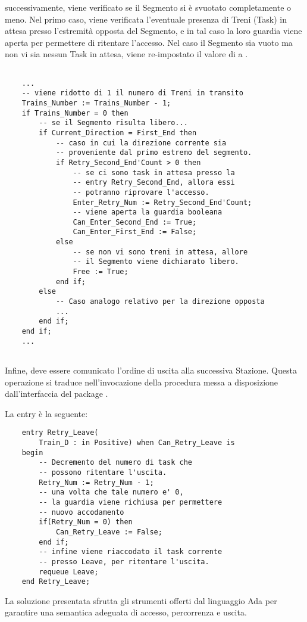 	successivamente, viene verificato se il Segmento si è svuotato completamente o meno. Nel primo caso, viene verificata l'eventuale presenza di Treni (Task) in attesa presso l'estremità opposta del Segmento, e in tal caso la loro guardia viene aperta per permettere
di ritentare l'accesso. Nel caso il Segmento sia vuoto ma non vi sia nessun Task in attesa, viene re-impostato il valore di  a .

\begin{lstlisting}
	
	...
	-- viene ridotto di 1 il numero di Treni in transito
	Trains_Number := Trains_Number - 1;
	if Trains_Number = 0 then
		-- se il Segmento risulta libero...
		if Current_Direction = First_End then
			-- caso in cui la direzione corrente sia 
			-- proveniente dal primo estremo del segmento.
			if Retry_Second_End'Count > 0 then
				-- se ci sono task in attesa presso la
				-- entry Retry_Second_End, allora essi 
				-- potranno riprovare l'accesso.
				Enter_Retry_Num := Retry_Second_End'Count;
				-- viene aperta la guardia booleana
				Can_Enter_Second_End := True;
				Can_Enter_First_End := False;
			else
				-- se non vi sono treni in attesa, allore
				-- il Segmento viene dichiarato libero.
				Free := True;
			end if;
		else
			-- Caso analogo relativo per la direzione opposta
			...
		end if;
	end if;
	...
	
\end{lstlisting}
	
	Infine, deve essere comunicato l'ordine di uscita alla successiva Stazione. Questa operazione si traduce nell'invocazione della procedura  messa a disposizione dall'interfaccia  del package . 
	
	La entry  è la seguente:
	
\begin{lstlisting}
	entry Retry_Leave(
		Train_D : in Positive) when Can_Retry_Leave is
	begin
		-- Decremento del numero di task che
		-- possono ritentare l'uscita.
		Retry_Num := Retry_Num - 1;
		-- una volta che tale numero e' 0, 
		-- la guardia viene richiusa per permettere
		-- nuovo accodamento
		if(Retry_Num = 0) then
			Can_Retry_Leave := False;
		end if;
		-- infine viene riaccodato il task corrente
		-- presso Leave, per ritentare l'uscita.
		requeue Leave;
	end Retry_Leave;

\end{lstlisting}

La soluzione presentata sfrutta gli strumenti offerti dal linguaggio Ada per garantire una semantica adeguata di accesso, percorrenza e uscita.
